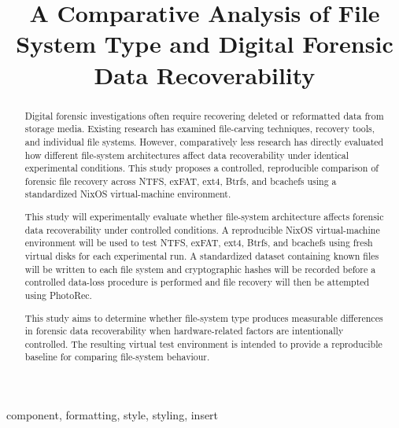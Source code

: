 \documentclass[conference]{IEEEtran}
\begin{document}
\title{A Comparative Analysis of File System Type and Digital Forensic Data Recoverability
\\
}

\author{
}

\maketitle
\begin{abstract}

Digital forensic investigations often require recovering deleted or reformatted data from storage media. Existing research has examined file-carving techniques, recovery tools, and individual file systems. However, comparatively less research has directly evaluated how different file-system architectures affect data recoverability under identical experimental conditions. This study proposes a controlled, reproducible comparison of forensic file recovery across NTFS, exFAT, ext4, Btrfs, and bcachefs using a standardized NixOS virtual-machine environment.

This study will experimentally evaluate whether file-system architecture affects forensic data recoverability under controlled conditions. A reproducible NixOS virtual-machine environment will be used to test NTFS, exFAT, ext4, Btrfs, and bcachefs using fresh virtual disks for each experimental run. A standardized dataset containing known files will be written to each file system and cryptographic hashes will be recorded before a controlled data-loss procedure is performed and file recovery will then be attempted using PhotoRec.

This study aims to determine whether file-system type produces measurable differences in forensic data recoverability when hardware-related factors are intentionally controlled. The resulting virtual test environment is intended to provide a reproducible baseline for comparing file-system behaviour.


\end{abstract}

\begin{IEEEkeywords}
component, formatting, style, styling, insert
\end{IEEEkeywords}
\end{document}
